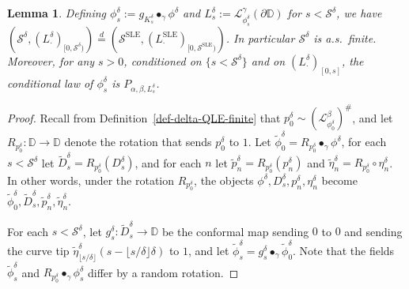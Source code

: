 \documentclass[a4paper]{article}
\numberwithin{equation}{section}
\newcommand{\D}{\mathbb{D}}
\newcommand{\cL}{\mathcal{L}}
\newcommand{\qduration}{\mathcal{S}}
\newcommand{\SLE}{\mathrm{SLE}}
\newtheorem{lemma}[theorem]{Lemma}
\theoremstyle{remark}
\numberwithin{equation}{section}
\begin{document}
\begin{lemma}\label{lem-duration-indep} 
Defining $\phi_s^\delta := g_{K^\delta_s} \bullet_\gamma \phi^\delta$ and  $L_s^\delta := \cL^\gamma_{\phi_s^\delta}(\partial \D)$ for $s <\qduration^{\delta}$, we have $(\qduration^\delta,(L_\cdot^\delta)_{[0,\qduration^\delta)}) \stackrel d= (\qduration^\SLE, (L_\cdot^\SLE)_{[0,\qduration^\SLE)})$. In particular $\qduration^\delta$ is a.s.\ finite. Moreover, for any $s>0$, conditioned on $\{s < \qduration^{\delta}\}$  and on $(L^\delta_\cdot)_{[0,s]}$, the conditional law of $\phi_s^\delta$ is $P_{\alpha, \beta, L_s^\delta}$.
\end{lemma}
\begin{proof}
    Recall from Definition~\ref{def-delta-QLE-finite} that $p^\delta_0 \sim ( \cL^\beta_{\phi^\delta_0})^\#$, and let $R_{p^\delta_0}: \D \to \D$ denote the rotation that sends $p^\delta_0$ to $1$. Let $\tilde \phi^\delta_0 = R_{p^\delta_0} \bullet_\gamma \phi^\delta$, for each $s < \qduration^\delta$ let $\tilde D^\delta_s = R_{p^\delta_0}( D^\delta_s)$, and for each $n$ let $\tilde p^\delta_{n} = R_{p^\delta_0}(p^\delta_n)$ and $\tilde \eta^\delta_n = R_{p^\delta_0} \circ \eta^\delta_n$. In other words, under the rotation $R_{p^\delta_0}$, the objects $\phi^\delta,  D^\delta_s, p^\delta_{n}, \eta^\delta_n$  become $\tilde \phi^\delta_0, \tilde D^\delta_s, \tilde p^\delta_{n}, \tilde \eta^\delta_n$. 

    For each $s < \qduration^\delta$, let $g^\delta_s: \tilde D^\delta_s \to \D$ be the conformal map sending $0$ to $0$ and sending the curve tip $\tilde \eta^\delta_{\lfloor s/\delta\rfloor}(s - \lfloor s/\delta \rfloor \delta)$ to $1$, and let $\tilde \phi^\delta_s = g^\delta_s \bullet_\gamma \tilde \phi^\delta_0
    $. Note that the fields $\tilde \phi^\delta_s$ and $R_{p^\delta_0} \bullet_\gamma \phi^\delta_s$ differ by a random rotation. 


\end{proof}
\end{document}
